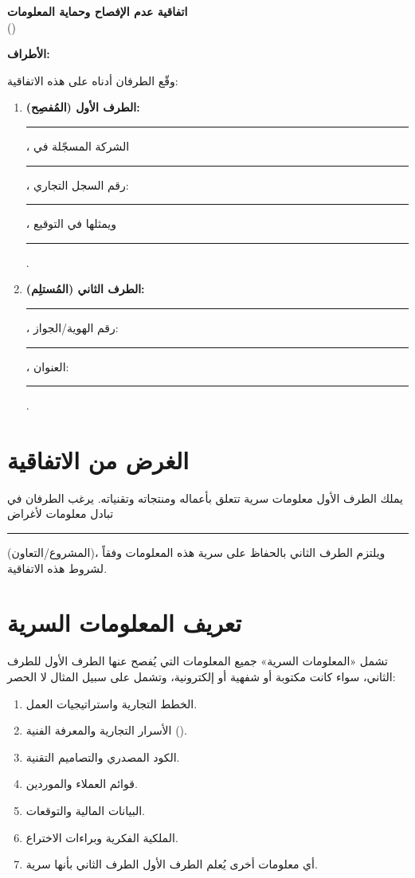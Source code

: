 \documentclass[12pt,a4paper]{article}
\begin{document}
\begin{center}
{\LARGE\bfseries اتفاقية عدم الإفصاح وحماية المعلومات}\\[0.5em]
{\large ()}\\[1em]
\end{center}

\vspace{1em}

\noindent\textbf{الأطراف:}

\noindent وقّع الطرفان أدناه على هذه الاتفاقية:

\begin{enumerate}
    \item \textbf{الطرف الأول (المُفصِح):} \rule{8cm}{0.4pt}، الشركة المسجّلة في \rule{4cm}{0.4pt}، رقم السجل التجاري: \rule{4cm}{0.4pt}، ويمثلها في التوقيع \rule{6cm}{0.4pt}.

    \item \textbf{الطرف الثاني (المُستلِم):} \rule{8cm}{0.4pt}، رقم الهوية/الجواز: \rule{4cm}{0.4pt}، العنوان: \rule{6cm}{0.4pt}.
\end{enumerate}

\vspace{1em}

\section{الغرض من الاتفاقية}
\label{sec:purpose}
يملك الطرف الأول معلومات سرية تتعلق بأعماله ومنتجاته وتقنياته. يرغب الطرفان في تبادل معلومات لأغراض \rule{8cm}{0.4pt} (المشروع/التعاون)، ويلتزم الطرف الثاني بالحفاظ على سرية هذه المعلومات وفقاً لشروط هذه الاتفاقية.

\section{تعريف المعلومات السرية}
\label{sec:definition}
تشمل «المعلومات السرية» جميع المعلومات التي يُفصح عنها الطرف الأول للطرف الثاني، سواء كانت مكتوبة أو شفهية أو إلكترونية، وتشمل على سبيل المثال لا الحصر:
\begin{enumerate}
    \item الخطط التجارية واستراتيجيات العمل.
    \item الأسرار التجارية والمعرفة الفنية ().
    \item الكود المصدري والتصاميم التقنية.
    \item قوائم العملاء والموردين.
    \item البيانات المالية والتوقعات.
    \item الملكية الفكرية وبراءات الاختراع.
    \item أي معلومات أخرى يُعلم الطرف الأول الطرف الثاني بأنها سرية.
\end{enumerate}
\end{document}
